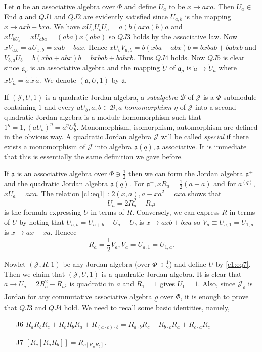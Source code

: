 Let $\mathfrak{a}$ be an associative algebra over $\Phi$ and define
$U_a$ to be $x\to a x a$. Then $U_a\in$ End $\mathfrak{a}$ and
$QJ1$ and $QJ2$ are evidently satisfied since $U_{a,b}$ is the mapping
$x\to a x b+b x a$. We have $xU_a U_b U_a=a(b(a x a)b)a$
and $xU_{bU_a}=xU_{aba}=(aba)x(aba)$ so $QJ3$ holds by the associative
law. Now $xV_{a.b}=a U_{x,b} = xab+bax$. Hence $xU_b
V_{a,b}=b(xba+abx)b=bxbab+babxb$ and\pageoriginale
$V_{b,a}U_b=b(xba+abx)b=bx bab+bab x b$. Thus $QJ4$ holds. Now $QJ5$
is clear since $\mathfrak{a}_{\underline\rho}$ is an associative
algebra and the mapping $\widetilde{U}$ of
$\mathfrak{a}_{\underline{\rho}}$ is $\widetilde{a}\to
\widetilde{U}_a$ where
$xU_{\widetilde{a}}=\tilde{a}\,\tilde{x}\,\tilde{a}$. We
denote $(\mathfrak{a}, U, 1)$ by $\mathfrak{a}$. 

If $(\mathscr{J},U,1)$ is a quadratic Jordan algebra, a {\em
  subalgebra} $\mathscr{B}$ of $\mathscr{J}$ is a $\Phi$-submodule
containing $1$ and every $a U_b,a,b\in\mathscr{B},a$ {\em
  homomorphism} $\eta$ of $\mathscr{J}$ into a second quadratic Jordan
algebra is a module homomorphism such that $1^{\eta}=1,
(aU_b)^{\eta}=a^{\eta}U_b^{\eta}$. Monomorphism, isomorphism,
automorphism are defined in the obvious way. A quadratic Jordan
algebra $\mathscr{J}$ will be called {\em special} if there exists a
monomorphism of $\mathscr{J}$ into algebra
$\mathfrak{a}(q),\mathfrak{a}$ associative. It is immediate that this
is essentially the same definition we gave before. 

If $\mathfrak{a}$ is an associative algebra over $\Phi\ni\frac{1}{2}$
then we can form the Jordan algebra $\mathfrak{a}^{+}$ and the
quadratic Jordan algebra $\mathfrak{a}(q)$. For $\mathfrak{a}^{+},
xR_a=\frac{1}{2}(a+a)$ and for $a^{(q)}$, $xU_a=axa$. The relation
\eqref{c1:eq1} :
$2(x,a),a-xa^{2}=axa$ shows that 
\begin{equation*}
U_a=2R^{2}_a-R_{a^{2}}\tag{7}\label{c1:eq7}
\end{equation*}
is the formula expressing $U$ in terms of $R$. Conversely, we can
express $R$ in terms of $U$ by noting that $U_{a,b}=U_{a+b}- U_a-U_b$ is $x\to
a x b + b x a$ so $V_a\equiv U_{a,1} = U_{1,a}$ is $x\to
ax+xa$. Hencec 
\begin{equation*}
R_a=\frac{1}{2}V_a,V_a=U_{a,1}=U_{1,a}.\tag{8}
\end{equation*}

Now\pageoriginale let $(\mathscr{J},R,1)$ be any Jordan algebra (over
$\Phi\ni\frac{1}{2}$) and define $U$ by \eqref{c1:eq7}. Then we claim that
$(\mathscr{J},U,1)$ is a quadratic Jordan algebra. It is clear that
$a\to U_a=2R^{2}_a-R_{a^{2}}$ is quadratic in $a$ and $R_1=1$ gives
$U_1=1$. Also, since $\mathscr{J}_{\underline\rho}$ is Jordan for any
commutative associative algebra $\underline{\rho}$ over $\Phi$, it is
enough to prove that $QJ3$ and $QJ4$ hold. We need to recall some
basic identities, namely,  
\begin{itemize}
\item[J6] $R_aR_bR_c+R_cR_bR_a+R_{(a\cdot c)\cdot b}=R_{a\cdot
  b}R_c+R_{b\cdot c}R_a+R_{c\cdot a}R_c$ 

\item[J7] $[R_c[R_a R_b]]=R_{c[R_aR_b]}$.
\end{itemize}

